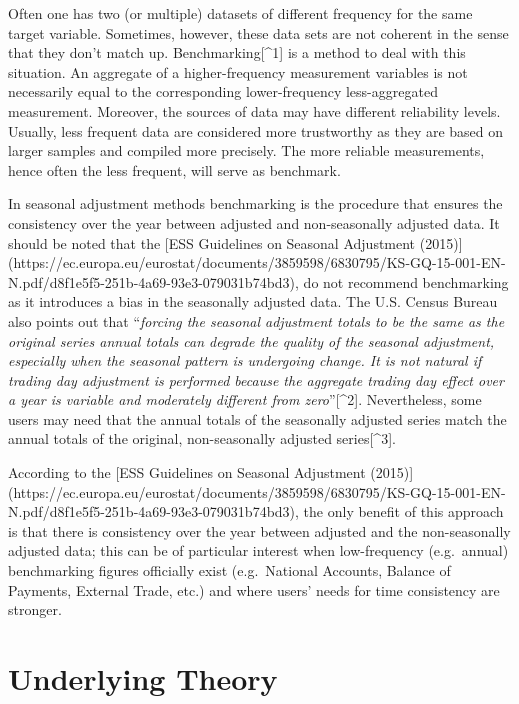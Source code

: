 \documentclass[
  letterpaper,
  DIV=11,
  numbers=noendperiod]{scrreprt}
\begin{document}
Often one has two (or multiple) datasets of different frequency for the
same target variable. Sometimes, however, these data sets are not
coherent in the sense that they don't match up. Benchmarking{[}\^{}1{]}
is a method to deal with this situation. An aggregate of a
higher-frequency measurement variables is not necessarily equal to the
corresponding lower-frequency less-aggregated measurement. Moreover, the
sources of data may have different reliability levels. Usually, less
frequent data are considered more trustworthy as they are based on
larger samples and compiled more precisely. The more reliable
measurements, hence often the less frequent, will serve as benchmark.

In seasonal adjustment methods benchmarking is the procedure that
ensures the consistency over the year between adjusted and
non-seasonally adjusted data. It should be noted that the {[}ESS
Guidelines on Seasonal Adjustment (2015){]}
(https://ec.europa.eu/eurostat/documents/3859598/6830795/KS-GQ-15-001-EN-N.pdf/d8f1e5f5-251b-4a69-93e3-079031b74bd3),
do not recommend benchmarking as it introduces a bias in the seasonally
adjusted data. The U.S. Census Bureau also points out that
``\emph{forcing the seasonal adjustment totals to be the same as the
original series annual totals can degrade the quality of the seasonal
adjustment, especially when the seasonal pattern is undergoing change.
It is not natural if trading day adjustment is performed because the
aggregate trading day effect over a year is variable and moderately
different from zero}''{[}\^{}2{]}. Nevertheless, some users may need
that the annual totals of the seasonally adjusted series match the
annual totals of the original, non-seasonally adjusted
series{[}\^{}3{]}.

According to the {[}ESS Guidelines on Seasonal Adjustment (2015){]}
(https://ec.europa.eu/eurostat/documents/3859598/6830795/KS-GQ-15-001-EN-N.pdf/d8f1e5f5-251b-4a69-93e3-079031b74bd3),
the only benefit of this approach is that there is consistency over the
year between adjusted and the non-seasonally adjusted data; this can be
of particular interest when low-frequency (e.g.~annual) benchmarking
figures officially exist (e.g.~National Accounts, Balance of Payments,
External Trade, etc.) and where users' needs for time consistency are
stronger.

\hypertarget{underlying-theory}{%
\section{Underlying Theory}\label{underlying-theory}}
\end{document}
